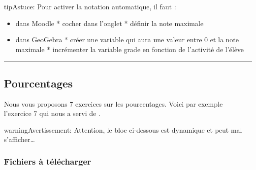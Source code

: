 \documentclass[letterpaper,10pt,french]{sphinxmanual}
\begin{document}
\begin{sphinxadmonition}{tip}{Astuce:}
Pour activer la notation automatique, il faut :
\begin{itemize}
\item {} 
dans Moodle
* cocher  dans l’onglet 
* définir la note maximale

\item {} 
dans GeoGebra
* créer une variable  qui aura une valeur entre 0 et la note maximale
* incrémenter la variable grade en fonction de l’activité de l’élève

\end{itemize}

\noindent{}

\end{sphinxadmonition}


\bigskip\hrule\bigskip



\subsection{Pourcentages}
\label{\detokenize{analyse alg_xe8bre - pourcentages:pourcentages}}\label{\detokenize{analyse alg_xe8bre - pourcentages::doc}}
Nous vous proposons 7 exercices sur les pourcentages.
Voici par exemple l’exercice 7 qui nous a servi de .

\begin{sphinxadmonition}{warning}{Avertissement:}
Attention, le bloc ci-dessous est dynamique et peut mal s’afficher…
\end{sphinxadmonition}




\subsubsection{Fichiers à télécharger}
\label{\detokenize{analyse alg_xe8bre - pourcentages:fichiers-a-telecharger}}
\end{document}
